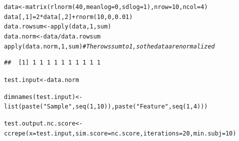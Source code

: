 \documentclass{article}\usepackage[]{graphicx}\usepackage[usenames,dvipsnames]{color}
\newcommand{\hlnum}[1]{\textcolor[rgb]{0.816,0.125,0.439}{#1}}%
\newcommand{\hlstr}[1]{\textcolor[rgb]{0.251,0.627,0.251}{#1}}%
\newcommand{\hlcom}[1]{\textcolor[rgb]{0.502,0.502,0.502}{\textit{#1}}}%
\newcommand{\hlopt}[1]{\textcolor[rgb]{0,0,0}{#1}}%
\newcommand{\hlstd}[1]{\textcolor[rgb]{0.251,0.251,0.251}{#1}}%
\newcommand{\hlkwb}[1]{\textcolor[rgb]{0,0,0}{#1}}%
\newcommand{\hlkwc}[1]{\textcolor[rgb]{0.251,0.251,0.251}{#1}}%
\newcommand{\hlkwd}[1]{\textcolor[rgb]{0.878,0.439,0.125}{#1}}%
\newenvironment{knitrout}{}{} %
\begin{document}
\begin{knitrout}
\color{fgcolor}\begin{kframe}
\begin{alltt}
\hlstd{data} \hlkwb{<-} \hlkwd{matrix}\hlstd{(}\hlkwd{rlnorm}\hlstd{(}\hlnum{40}\hlstd{,}\hlkwc{meanlog}\hlstd{=}\hlnum{0}\hlstd{,}\hlkwc{sdlog}\hlstd{=}\hlnum{1}\hlstd{),}\hlkwc{nrow}\hlstd{=}\hlnum{10}\hlstd{,}\hlkwc{ncol}\hlstd{=}\hlnum{4}\hlstd{)}
\hlstd{data[,}\hlnum{1}\hlstd{]} \hlkwb{=} \hlnum{2}\hlopt{*}\hlstd{data[,}\hlnum{2}\hlstd{]} \hlopt{+} \hlkwd{rnorm}\hlstd{(}\hlnum{10}\hlstd{,}\hlnum{0}\hlstd{,}\hlnum{0.01}\hlstd{)}
\hlstd{data.rowsum} \hlkwb{<-} \hlkwd{apply}\hlstd{(data,}\hlnum{1}\hlstd{,sum)}
\hlstd{data.norm} \hlkwb{<-} \hlstd{data}\hlopt{/}\hlstd{data.rowsum}
\hlkwd{apply}\hlstd{(data.norm,}\hlnum{1}\hlstd{,sum)}  \hlcom{# The rows sum to 1, so the data are normalized}
\end{alltt}
\begin{verbatim}
##  [1] 1 1 1 1 1 1 1 1 1 1
\end{verbatim}
\begin{alltt}
\hlstd{test.input} \hlkwb{<-} \hlstd{data.norm}

\hlkwd{dimnames}\hlstd{(test.input)} \hlkwb{<-} \hlkwd{list}\hlstd{(}\hlkwd{paste}\hlstd{(}\hlstr{"Sample"}\hlstd{,}\hlkwd{seq}\hlstd{(}\hlnum{1}\hlstd{,}\hlnum{10}\hlstd{)),}\hlkwd{paste}\hlstd{(}\hlstr{"Feature"}\hlstd{,}\hlkwd{seq}\hlstd{(}\hlnum{1}\hlstd{,}\hlnum{4}\hlstd{)))}

\hlstd{test.output.nc.score}     \hlkwb{<-} \hlkwd{ccrepe}\hlstd{(}\hlkwc{x}\hlstd{=test.input,} \hlkwc{sim.score}\hlstd{=nc.score,} \hlkwc{iterations}\hlstd{=}\hlnum{20}\hlstd{,} \hlkwc{min.subj}\hlstd{=}\hlnum{10}\hlstd{)}
\end{alltt}
\end{kframe}
\end{knitrout}
\end{document}
